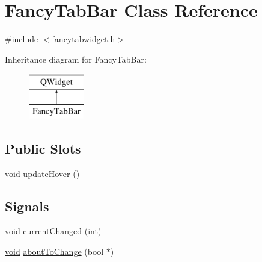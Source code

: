\hypertarget{class_fancy_tab_bar}{\section{Fancy\-Tab\-Bar Class Reference}
\label{class_fancy_tab_bar}
}


{\ttfamily \#include $<$fancytabwidget.\-h$>$}

Inheritance diagram for Fancy\-Tab\-Bar\-:\begin{figure}[H]
\begin{center}
\leavevmode
\includegraphics[height=2.000000cm]{class_fancy_tab_bar}
\end{center}
\end{figure}
\subsection*{Public Slots}
\begin{DoxyCompactItemize}
\item 
\hyperlink{group___u_a_v_objects_plugin_ga444cf2ff3f0ecbe028adce838d373f5c}{void} \hyperlink{group___core_plugin_gaebba5e848c986c159a23e73619bb0fa8}{update\-Hover} ()
\end{DoxyCompactItemize}
\subsection*{Signals}
\begin{DoxyCompactItemize}
\item 
\hyperlink{group___u_a_v_objects_plugin_ga444cf2ff3f0ecbe028adce838d373f5c}{void} \hyperlink{group___core_plugin_gab01320f8d84813aa496591d543e25d22}{current\-Changed} (\hyperlink{ioapi_8h_a787fa3cf048117ba7123753c1e74fcd6}{int})
\item 
\hyperlink{group___u_a_v_objects_plugin_ga444cf2ff3f0ecbe028adce838d373f5c}{void} \hyperlink{group___core_plugin_ga5f3214f2d2395c7aa4e95740fe71e711}{about\-To\-Change} (bool $\ast$)
\end{DoxyCompactItemize}
